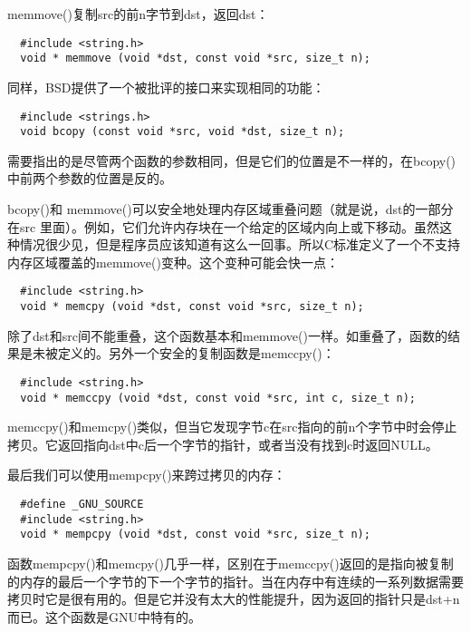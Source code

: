 memmove()复制src的前n字节到dst，返回dst： 

\begin{lstlisting}
  #include <string.h>
  void * memmove (void *dst, const void *src, size_t n);
\end{lstlisting}

同样，BSD提供了一个被批评的接口来实现相同的功能： 

\begin{lstlisting}
  #include <strings.h>
  void bcopy (const void *src, void *dst, size_t n);
\end{lstlisting}

需要指出的是尽管两个函数的参数相同，但是它们的位置是不一样的，在bcopy()中前两个参数的位置是反的。

bcopy()和 memmove()可以安全地处理内存区域重叠问题（就是说，dst的一部分在src 里面）。例如，它们允许内存块在一个给定的区域内向上或下移动。虽然这种情况很少见，但是程序员应该知道有这么一回事。所以C标准定义了一个不支持内存区域覆盖的memmove()变种。这个变种可能会快一点： 

\begin{lstlisting}
  #include <string.h>
  void * memcpy (void *dst, const void *src, size_t n);
\end{lstlisting}

除了dst和src间不能重叠，这个函数基本和memmove()一样。如重叠了，函数的结果是未被定义的。另外一个安全的复制函数是memccpy()： 

\begin{lstlisting}
  #include <string.h>
  void * memccpy (void *dst, const void *src, int c, size_t n);
\end{lstlisting}

memccpy()和memcpy()类似，但当它发现字节c在src指向的前n个字节中时会停止拷贝。它返回指向dst中c后一个字节的指针，或者当没有找到c时返回NULL。

最后我们可以使用mempcpy()来跨过拷贝的内存： 

\begin{lstlisting}
  #define _GNU_SOURCE
  #include <string.h>
  void * mempcpy (void *dst, const void *src, size_t n);
\end{lstlisting}

函数mempcpy()和memcpy()几乎一样，区别在于memccpy()返回的是指向被复制的内存的最后一个字节的下一个字节的指针。当在内存中有连续的一系列数据需要拷贝时它是很有用的。但是它并没有太大的性能提升，因为返回的指针只是dst+n而已。这个函数是GNU中特有的。 

